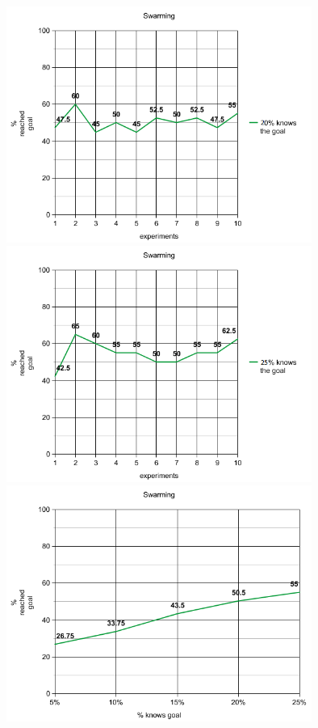\documentclass[a4paper,10pt]{article}
\begin{document}
\includegraphics[width=10cm]{graph_3.png}\\
\includegraphics[width=10cm]{graph_4.png}\\
\includegraphics[width=10cm]{ug.png}\\
\end{document}
